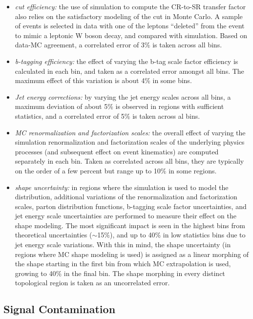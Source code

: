\begin{itemize}
	\item {\it \Mt cut efficiency:} the use of simulation to compute the CR-to-SR transfer factor also relies on the satisfactory modeling of the \Mt cut in Monte Carlo. A sample of \Zll events is selected in data with one of the leptons ``deleted'' from the event to mimic a leptonic W boson decay, and compared with simulation. Based on data-MC agreement, a correlated error of 3\% is taken across all bins.
	\item {\it b-tagging efficiency:} the effect of varying the b-tag scale factor efficiency is calculated in each bin, and taken as a correlated error amongst all bins. The maximum effect of this variation is about 4\% in some bins.
	\item {\it Jet energy corrections:} by varying the jet energy scales across all bins, a maximum deviation of about 5\% is observed in regions with sufficient statistics, and a correlated error of 5\% is taken across al bins.
	\item {\it MC renormalization and factorization scales:} the overall effect of varying the simulation renormalization and factorization scales of the underlying physics processes (and subsequent effect on event kinematics) are computed separately in each bin. Taken as correlated across all bins, they are typically on the order of a few percent but range up to 10\% in some regions.
	\item {\it \mttwo shape uncertainty:} in regions where the simulation is used to model the \mttwo distribution, additional variations of the renormalization and factorization scales, parton distribution functions, b-tagging scale factor uncertainties, and jet energy scale uncertainties are performed to measure their effect on the \mttwo shape modeling. The most significant impact is seen in the highest \mttwo bins from theoretical uncertainties ($\sim$15\%), and up to 40\% in low statistics bins due to jet energy scale variations. With this in mind, the shape uncertainty (in regions where MC \mttwo shape modeling is used) is assigned as a linear morphing of the \mttwo shape starting in the first bin from which MC extrapolation is used, growing to 40\% in the final bin. The shape morphing in every distinct topological region is taken as an uncorrelated error.
\end{itemize}


\subsection{Signal Contamination}
\label{subsec:signalContamination}

